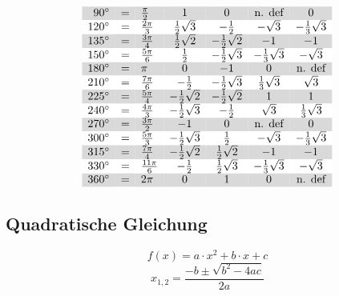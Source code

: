 \[{\begin{array}{rclcccc}
\rowcolor{lgray} 90^\circ &=&\frac{\pi}{2}    &                      1&                      0&          \text{n. def}&                      0\\
\rowcolor{white} 120^\circ&=&\frac{2\pi}{3}   &    \frac{1}{2}\sqrt{3}&           -\frac{1}{2}&              -\sqrt{3}&   -\frac{1}{3}\sqrt{3}\\
\rowcolor{lgray} 135^\circ&=&\frac{3\pi}{4}   &    \frac{1}{2}\sqrt{2}&   -\frac{1}{2}\sqrt{2}&                     -1&                     -1\\
\rowcolor{white} 150^\circ&=&\frac{5\pi}{6}   &            \frac{1}{2}&   -\frac{1}{2}\sqrt{3}&   -\frac{1}{3}\sqrt{3}&              -\sqrt{3}\\
\rowcolor{lgray} 180^\circ&=&\pi              &                      0&                     -1&                      0&          \text{n. def}\\
\rowcolor{white} 210^\circ&=&\frac{7\pi}{6}   &           -\frac{1}{2}&   -\frac{1}{2}\sqrt{3}&    \frac{1}{3}\sqrt{3}&               \sqrt{3}\\
\rowcolor{lgray} 225^\circ&=&\frac{5\pi}{4}   &   -\frac{1}{2}\sqrt{2}&   -\frac{1}{2}\sqrt{2}&                      1&                      1\\
\rowcolor{white} 240^\circ&=&\frac{4\pi}{3}   &   -\frac{1}{2}\sqrt{3}&           -\frac{1}{2}&               \sqrt{3}&    \frac{1}{3}\sqrt{3}\\
\rowcolor{lgray} 270^\circ&=&\frac{3\pi}{2}   &                     -1&                      0&          \text{n. def}&                      0\\
\rowcolor{white} 300^\circ&=&\frac{5\pi}{3}   &   -\frac{1}{2}\sqrt{3}&            \frac{1}{2}&              -\sqrt{3}&   -\frac{1}{3}\sqrt{3}\\
\rowcolor{lgray} 315^\circ&=&\frac{7\pi}{4}   &   -\frac{1}{2}\sqrt{2}&    \frac{1}{2}\sqrt{2}&                     -1&                     -1\\
\rowcolor{white} 330^\circ&=&\frac{11\pi}{6}  &           -\frac{1}{2}&    \frac{1}{2}\sqrt{3}&   -\frac{1}{3}\sqrt{3}&              -\sqrt{3}\\
\rowcolor{lgray} 360^\circ&=&2 \pi            &                      0&                      1&                      0&          \text{n. def}\\
\end{array}} \]

\newpage
\subsection{Quadratische Gleichung}
\[ \boxed{f(x) = a \cdot x^2 + b \cdot x + c} \]
\[ \boxed{x_{1,2}=\frac{-b\pm\sqrt{b^2-4ac}}{2a}} \]

